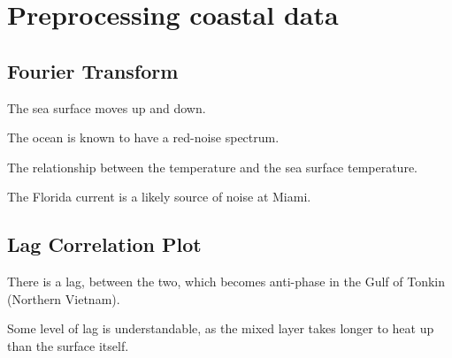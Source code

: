 \section{Preprocessing coastal data}
\subsection{Fourier Transform}
\label{sec:fourier}

The sea surface moves up and down.

The ocean is known to have a red-noise spectrum.

The relationship between the temperature and the sea surface temperature.

The Florida current is a likely source of noise at Miami.

\subsection{Lag Correlation Plot}
\label{sec:lag}

There is a lag, between the two, which becomes anti-phase in the Gulf
of Tonkin (Northern Vietnam).

Some level of lag is understandable, as the mixed layer takes longer
to heat up than the surface itself.
